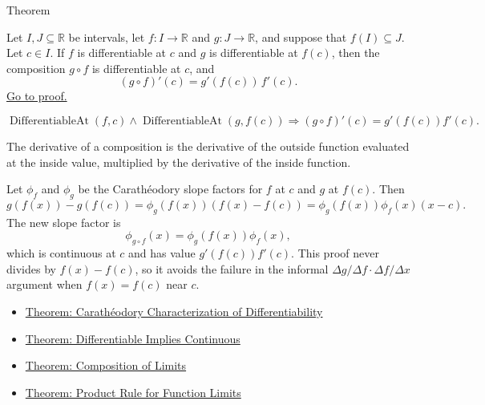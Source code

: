 
\begin{theorembox}{Theorem}
\begin{theorem}
\label{thm:chain-rule}
Let $I, J \subseteq \mathbb{R}$ be intervals, let $f : I \to \mathbb{R}$ and $g : J \to \mathbb{R}$, and suppose that $f(I) \subseteq J$. Let $c \in I$. If $f$ is differentiable at $c$ and $g$ is differentiable at $f(c)$, then the composition $g \circ f$ is differentiable at $c$, and
\[
(g \circ f)'(c) = g'(f(c))\,f'(c).
\]
\hyperref[prf:chain-rule]{Go to proof.}
\end{theorem}
\end{theorembox}

\begin{remark*}
\[
  \operatorname{DifferentiableAt}(f,c)
  \land
  \operatorname{DifferentiableAt}(g,f(c))
  \Longrightarrow
  (g\circ f)'(c)=g'(f(c))f'(c).
\]
\end{remark*}

\begin{remark*}[Interpretation]
The derivative of a composition is the derivative of the outside function evaluated at the inside value, multiplied by the derivative of the inside function.
\end{remark*}

\begin{remark*}[Interpretation]
Let $\phi_f$ and $\phi_g$ be the Carath\'{e}odory slope factors for $f$ at $c$
and $g$ at $f(c)$. Then
\[
g(f(x))-g(f(c))
  =
\phi_g(f(x))(f(x)-f(c))
  =
\phi_g(f(x))\phi_f(x)(x-c).
\]
The new slope factor is
\[
  \phi_{g\circ f}(x)=\phi_g(f(x))\phi_f(x),
\]
which is continuous at $c$ and has value $g'(f(c))f'(c)$. This proof never
divides by $f(x)-f(c)$, so it avoids the failure in the informal
$\Delta g/\Delta f \cdot \Delta f/\Delta x$ argument when $f(x)=f(c)$ near
$c$.
\end{remark*}

\begin{dependencies}
\begin{itemize}
  \item \hyperref[thm:caratheodory-characterization-of-differentiability]{Theorem: Carath\'{e}odory Characterization of Differentiability}
  \item \hyperref[thm:differentiable-implies-continuous]{Theorem: Differentiable Implies Continuous}
  \item \hyperref[thm:composition-of-limits]{Theorem: Composition of Limits}
  \item \hyperref[thm:limit-product]{Theorem: Product Rule for Function Limits}
\end{itemize}
\end{dependencies}

